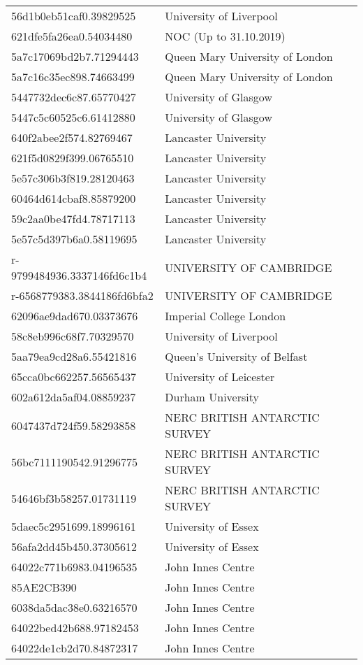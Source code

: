 \begin{tabular}{ll}
56d1b0eb51caf0.39829525 & University of Liverpool \\
621dfe5fa26ea0.54034480 & NOC (Up to 31.10.2019) \\
5a7c17069bd2b7.71294443 & Queen Mary University of London \\
5a7c16c35ec898.74663499 & Queen Mary University of London \\
5447732dec6c87.65770427 & University of Glasgow \\
5447c5c60525c6.61412880 & University of Glasgow \\
640f2abee2f574.82769467 & Lancaster University \\
621f5d0829f399.06765510 & Lancaster University \\
5e57c306b3f819.28120463 & Lancaster University \\
60464d614cbaf8.85879200 & Lancaster University \\
59c2aa0be47fd4.78717113 & Lancaster University \\
5e57c5d397b6a0.58119695 & Lancaster University \\
r-9799484936.3337146fd6c1b4 & UNIVERSITY OF CAMBRIDGE \\
r-6568779383.3844186fd6bfa2 & UNIVERSITY OF CAMBRIDGE \\
62096ae9dad670.03373676 & Imperial College London \\
58c8eb996c68f7.70329570 & University of Liverpool \\
5aa79ea9cd28a6.55421816 & Queen's University of Belfast \\
65cca0bc662257.56565437 & University of Leicester \\
602a612da5af04.08859237 & Durham University \\
6047437d724f59.58293858 & NERC BRITISH ANTARCTIC SURVEY \\
56bc7111190542.91296775 & NERC BRITISH ANTARCTIC SURVEY \\
54646bf3b58257.01731119 & NERC BRITISH ANTARCTIC SURVEY \\
5daec5c2951699.18996161 & University of Essex \\
56afa2dd45b450.37305612 & University of Essex \\
64022c771b6983.04196535 & John Innes Centre \\
85AE2CB390 & John Innes Centre \\
6038da5dac38e0.63216570 & John Innes Centre \\
64022bed42b688.97182453 & John Innes Centre \\
64022de1cb2d70.84872317 & John Innes Centre \\

\end{tabular}
